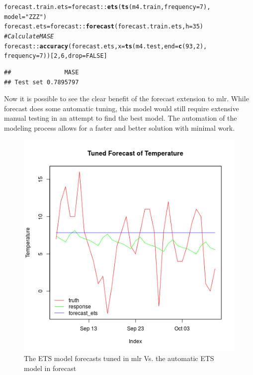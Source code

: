 \documentclass[12pt]{article}\usepackage[]{graphicx}\usepackage[]{color}
\makeatletter
\newcommand{\hlnum}[1]{\textcolor[rgb]{0.686,0.059,0.569}{#1}}%
\newcommand{\hlstr}[1]{\textcolor[rgb]{0.192,0.494,0.8}{#1}}%
\newcommand{\hlcom}[1]{\textcolor[rgb]{0.678,0.584,0.686}{\textit{#1}}}%
\newcommand{\hlopt}[1]{\textcolor[rgb]{0,0,0}{#1}}%
\newcommand{\hlstd}[1]{\textcolor[rgb]{0.345,0.345,0.345}{#1}}%
\newcommand{\hlkwb}[1]{\textcolor[rgb]{0.69,0.353,0.396}{#1}}%
\newcommand{\hlkwc}[1]{\textcolor[rgb]{0.333,0.667,0.333}{#1}}%
\newcommand{\hlkwd}[1]{\textcolor[rgb]{0.737,0.353,0.396}{\textbf{#1}}}%
\newenvironment{kframe}{%
 \def\at@end@of@kframe{}%
 \ifinner\ifhmode%
  \def\at@end@of@kframe{\end{minipage}}%
  \begin{minipage}{\columnwidth}%
 \fi\fi%
 \def\FrameCommand##1{\hskip\@totalleftmargin \hskip-\fboxsep
 \colorbox{shadecolor}{##1}\hskip-\fboxsep
     \hskip-\linewidth \hskip-\@totalleftmargin \hskip\columnwidth}%
 \MakeFramed {\advance\hsize-\width
   \@totalleftmargin\z@ \linewidth\hsize
   \@setminipage}}%
 {\par\unskip\endMakeFramed%
 \at@end@of@kframe}
\newenvironment{knitrout}{}{} %
\theoremstyle{definition}
\newcommand{\pkg}[1]{{\fontseries{b}\selectfont #1}}
\makeatother
\begin{document}
\singlespacing
\begin{knitrout}
\color{fgcolor}\begin{kframe}
\begin{alltt}
\hlstd{forecast.train.ets} \hlkwb{=} \hlstd{forecast}\hlopt{::}\hlkwd{ets}\hlstd{(}\hlkwd{ts}\hlstd{(m4.train,}\hlkwc{frequency} \hlstd{=} \hlnum{7}\hlstd{),}
                                   \hlkwc{model} \hlstd{=} \hlstr{"ZZZ"}\hlstd{)}
\hlstd{forecast.ets} \hlkwb{=} \hlstd{forecast}\hlopt{::}\hlkwd{forecast}\hlstd{(forecast.train.ets,}\hlkwc{h}\hlstd{=}\hlnum{35}\hlstd{)}
\hlcom{# Calculate MASE}
\hlstd{forecast}\hlopt{::}\hlkwd{accuracy}\hlstd{(forecast.ets,} \hlkwc{x}\hlstd{=} \hlkwd{ts}\hlstd{(m4.test,} \hlkwc{end} \hlstd{=} \hlkwd{c}\hlstd{(}\hlnum{93}\hlstd{,}\hlnum{2}\hlstd{),}
                                  \hlkwc{frequency} \hlstd{=} \hlnum{7}\hlstd{))[}\hlnum{2}\hlstd{,}\hlnum{6}\hlstd{,}\hlkwc{drop}\hlstd{=}\hlnum{FALSE}\hlstd{]}
\end{alltt}
\begin{verbatim}
##               MASE
## Test set 0.7895797
\end{verbatim}
\end{kframe}
\end{knitrout}
\doublespacing

Now it is possible to see the clear benefit of the forecast extension to \pkg{mlr}. While \pkg{forecast} does some automatic tuning, this model would still require extensive manual testing in an attempt to find the best model. The automation of the modeling process allows for a faster and better solution with minimal work.



\begin{figure}[H]
  \includegraphics[width=\linewidth]{plot_ets_vs_forecast.png}
  \centering
  \caption{The ETS model forecasts tuned in \pkg{mlr} Vs. the automatic ETS model in forecast}
  \label{fig:mlrvsforecast}
\end{figure}
\end{document}
